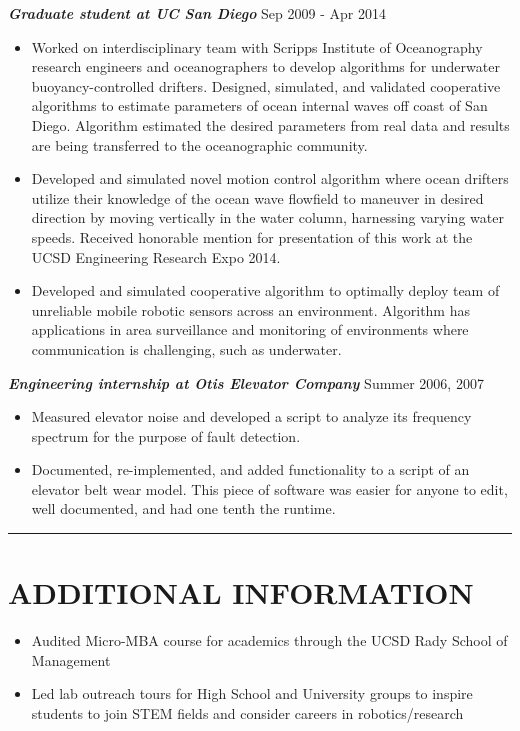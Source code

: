\documentclass{res}
\begin{document}
\begin{resume}
\begin{itemize}
\end{itemize}
\vspace*{-1ex}
{\sl  \bf Graduate student at UC San Diego} \hfill Sep 2009 - Apr 2014 
\begin{itemize}
\item Worked on interdisciplinary team with Scripps Institute of Oceanography research engineers and oceanographers to develop algorithms for underwater buoyancy-controlled drifters. Designed, simulated, and validated cooperative algorithms to estimate parameters of ocean internal waves off coast of San Diego.  Algorithm estimated the desired parameters from real data and results are being transferred to the oceanographic community.
\item Developed and simulated novel motion control algorithm where ocean drifters utilize their knowledge of the ocean wave flowfield to maneuver in desired direction by moving vertically in the water column, harnessing varying water speeds. Received honorable mention for presentation of this work at the UCSD Engineering Research Expo 2014.
\item Developed and simulated cooperative algorithm to optimally deploy team of unreliable mobile robotic sensors across an environment. Algorithm has applications in area surveillance and monitoring of environments where communication is challenging, such as underwater. 
\end{itemize}
\vspace*{-2ex}
 {\sl \bf Engineering internship at Otis Elevator Company} \hfill Summer 2006, 2007 
\begin{itemize}
\item Measured elevator noise and developed a script to analyze its frequency spectrum for the purpose of fault detection. 
\item Documented, re-implemented, and added functionality to a script of an elevator belt wear model.  This piece of software was easier for anyone to edit, well documented, and had one tenth the runtime.
\end{itemize}
%
 \vspace*{-3ex}
\hspace{-8.5ex}\rule{16.5cm}{0.4pt}
 \vspace*{-3ex}
\section{ADDITIONAL INFORMATION}
\begin{itemize}
\item Audited Micro-MBA course for academics through the UCSD Rady School of Management
\item Led lab outreach tours for High School and University groups to inspire students to join STEM fields and consider careers in robotics/research
\end{itemize}



\end{resume}
\end{document}
